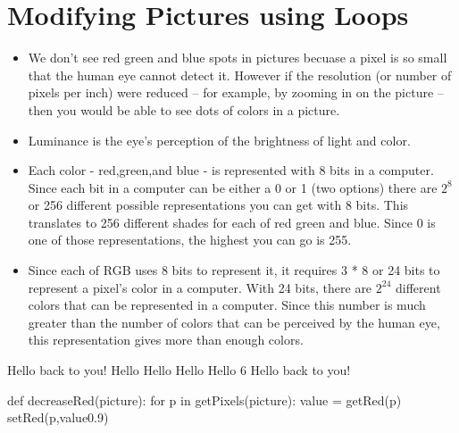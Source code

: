 \chapter{Modifying Pictures using Loops}

\begin{exercises}

\begin{ex}
\begin{itemize}

\item We don't see red green and blue spots in pictures becuase a pixel is
so small that the human eye cannot detect it. However if the resolution (or
number of pixels per inch) were reduced -- for example, by zooming in on
the picture -- then you would be able to see dots of colors in a picture.

\item Luminance is the eye's perception of the brightness of light and
color.

\item Each color - red,green,and blue - is represented with 8 bits in a
computer.  Since each bit in a computer can be either a 0 or 1 (two
options) there are $2^8$ or 256 different possible representations you can
get with 8 bits.  This translates to 256 different shades for each of red
green and blue.  Since 0 is one of those representations, the highest you
can go is 255.

\item Since each of RGB uses 8 bits to represent it, it requires 3 * 8 or 24
bits to represent a pixel's color in a computer. With 24 bits, there are
$2^24$ different colors that can be represented in a computer. Since this
number is much greater than the number of colors that can be perceived by
the human eye, this representation gives more than enough colors.
\end{itemize}

\end{ex}


\begin{ex}
Hello back to you!
Hello
Hello
Hello
Hello
6
Hello back to you!
\end{ex}

\begin{ex}

\begin{example}
def decreaseRed(picture):
		for p in getPixels(picture):
		value = getRed(p)
		setRed(p,value0.9)


\end{example}
\end{ex}
\end{exercises}
